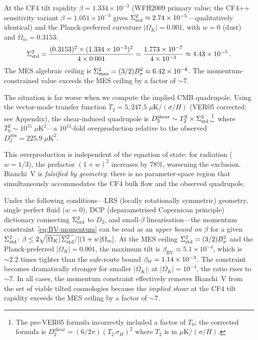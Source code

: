 At the CF4 tilt rapidity $\beta = 1.334 \times 10^{-3}$
(WFH2009 primary value; the CF4++ sensitivity variant
$\beta = 1.051 \times 10^{-3}$ gives
$\Sigma^2_{\mathrm{std}} \approx 2.74 \times 10^{-5}$---qualitatively
identical)
and the Planck-preferred curvature
$|\Omega_K| = 0.001$, with $w = 0$ (dust) and
$\Omega_m = 0.3153$:
\begin{equation}\label{eq:BV-Sig2-num}
\Sigma^2_{\mathrm{std}}
= \frac{(0.3153)^2 \times (1.334 \times 10^{-3})^2}
       {4 \times 0.001}
= \frac{1.773 \times 10^{-7}}{4 \times 10^{-3}}
\approx 4.43 \times 10^{-5}\,.
\end{equation}
The MES algebraic ceiling is
$\Sigma^2_{\max} = (3/2)B_\sigma^2 \approx 6.42 \times
10^{-6}$.  The momentum-constrained value exceeds the MES
ceiling by a factor of $\sim 7$.

The situation is far worse when we compute the implied CMB
quadrupole.  Using the vector-mode transfer function
$T_2 = 5{,}247.5\;\mu\mathrm{K}/(\sigma/H)$ (VER05 corrected; see Appendix), the shear-induced quadrupole is
$D_2^{\mathrm{shear}} \sim T_2^2 \times \Sigma^2_{\mathrm{std}}$,\footnote{The pre-VER05 formula incorrectly included a factor of $T_0$; the corrected formula is $D_2^{\mathrm{shear}} = (6/2\pi)(T_2\,\sigma_H)^2$ where $T_2$ is in $\mu\mathrm{K}/(\sigma/H)$.}\, where $T_0^2
\sim 10^{15}\;\mu\mathrm{K}^2$---a $10^{13}$-fold
overproduction relative to the observed
$D_2^{\mathrm{obs}} = 225.9\;\mu\mathrm{K}^2$.

This overproduction is independent of the equation of state:
for radiation ($w = 1/3$), the prefactor $(1+w)^2$ increases by
$78\%$, worsening the exclusion.  Bianchi~V is
\emph{falsified by geometry}: there is no parameter-space region
that simultaneously accommodates the CF4 bulk flow and the
observed quadrupole.

\begin{remark}
\label{rem:BV-tilt-bound}
Under the following conditions---LRS (locally rotationally
symmetric) geometry, single perfect fluid ($w = 0$), DCP
(deparametrised Copernican principle) dictionary connecting
$\Sigma^2_{\mathrm{std}}$ to $D_2$, and small-$\beta$ linearisation---the
momentum constraint~\eqref{eq:BV-momentum} can be read as
an \emph{upper bound on $\beta$} for a given $\Sigma^2_{\mathrm{std}}$:
$\beta \leq 2\sqrt{|\Omega_K|\,\Sigma^2_{\mathrm{std}}}/[(1+w)\Omega_m]$.
At the MES ceiling $\Sigma^2_{\mathrm{std}} = (3/2)B_\sigma^2$ and the Planck-preferred
$|\Omega_K| = 0.001$, the maximum tilt is
$\beta_{\mathrm{BV}} \approx 5.1 \times 10^{-4}$,
which is $\sim 2.2$ times tighter than the safe-route bound
$\beta_{\mathrm{sr}} = 1.14 \times 10^{-3}$.  The constraint becomes
dramatically stronger for smaller $|\Omega_K|$: at
$|\Omega_K| = 10^{-4}$, the ratio rises to $\sim 7$.  In all
cases, the momentum constraint effectively removes Bianchi~V
from the set of viable tilted cosmologies because the
\emph{implied shear} at the CF4 tilt rapidity exceeds the MES
ceiling by a factor of $\sim 7$.
\end{remark}


